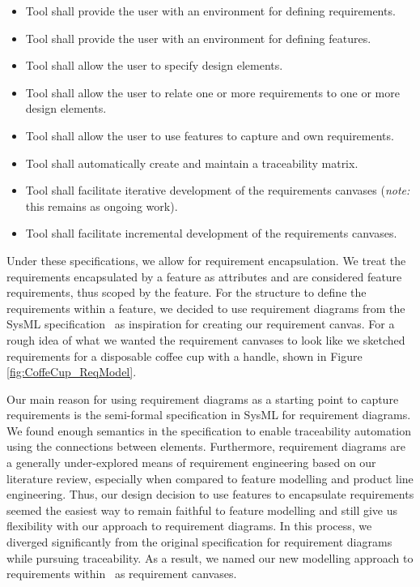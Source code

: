 \begin{itemize}
	\item Tool shall provide the user with an environment for defining requirements.
	\item Tool shall provide the user with an environment for defining features.
	\item Tool shall allow the user to specify design elements.
	\item Tool shall allow the user to relate one or more requirements to one or more design elements.
	\item Tool shall allow the user to use features to capture and own requirements.
	\item Tool shall automatically create and maintain a traceability matrix.
	\item Tool shall facilitate iterative development of the requirements canvases (\textit{note:} this remains as ongoing work).
	\item Tool shall facilitate incremental development of the requirements canvases.
\end{itemize}

Under these specifications, we allow for requirement encapsulation. We treat the requirements encapsulated by a feature as attributes and are considered feature requirements, thus scoped by the feature. For the structure to define the requirements within a feature, we decided to use requirement diagrams from the SysML specification~\cite{sysml2019omg} as inspiration for creating our requirement canvas. For a rough idea of what we wanted the requirement canvases to look like we sketched requirements for a disposable coffee cup with a handle, shown in Figure \ref{fig:CoffeCup_ReqModel}.

Our main reason for using requirement diagrams as a starting point to capture requirements is the semi-formal specification in SysML for requirement diagrams. We found enough semantics in the specification to enable traceability automation using the connections between elements. Furthermore, requirement diagrams are a generally under-explored means of requirement engineering based on our literature review, especially when compared to feature modelling and product line engineering. Thus, our design decision to use features to encapsulate requirements seemed the easiest way to remain faithful to feature modelling and still give us flexibility with our approach to requirement diagrams. In this process, we diverged significantly from the original specification for requirement diagrams while pursuing traceability. As a result, we named our new modelling approach to requirements within \tool\ as requirement canvases.

